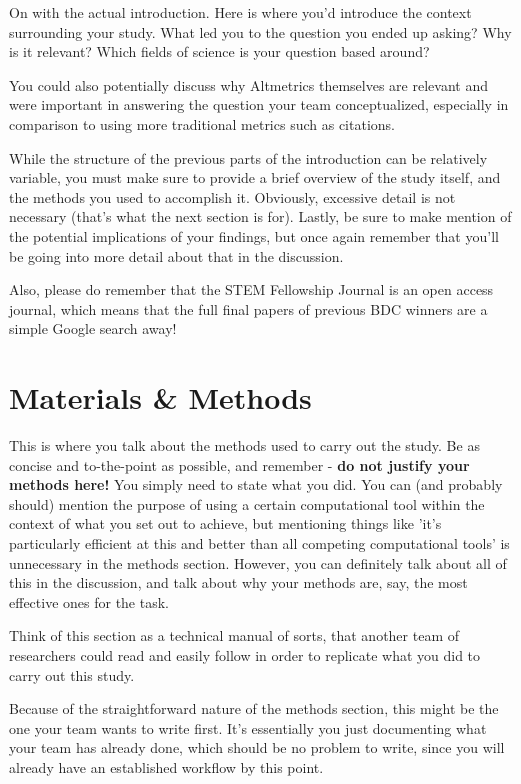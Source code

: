\documentclass[10pt,twocolumn,letterpaper]{article}
\begin{document}
On with the actual introduction. Here is where you'd introduce the context surrounding your study. What led you to the question you ended up asking? Why is it relevant? Which fields of science is your question based around?

You could also potentially discuss why Altmetrics themselves are relevant and were important in answering the question your team conceptualized, especially in comparison to using more traditional metrics such as citations.

While the structure of the previous parts of the introduction can be relatively variable, you must make sure to provide a brief overview of the study itself, and the methods you used to accomplish it. Obviously, excessive detail is not necessary (that's what the next section is for). Lastly, be sure to make mention of the potential implications of your findings, but once again remember that you'll be going into more detail about that in the discussion.

Also, please do remember that the STEM Fellowship Journal is an open access journal, which means that the full final papers of previous BDC winners are a simple Google search away!

\section{Materials \& Methods}

This is where you talk about the methods used to carry out the study. Be as concise and to-the-point as possible, and remember - \textbf{do not justify your methods here!} You simply need to state what you did. You can (and probably should) mention the purpose of using a certain computational tool within the context of what you set out to achieve, but mentioning things like 'it's particularly efficient at this and better than all competing computational tools' is unnecessary in the methods section. However, you can definitely talk about all of this in the discussion, and talk about why your methods are, say, the most effective ones for the task.

Think of this section as a technical manual of sorts, that another team of researchers could read and easily follow in order to replicate what you did to carry out this study.

Because of the straightforward nature of the methods section, this might be the one your team wants to write first. It's essentially you just documenting what your team has already done, which should be no problem to write, since you will already have an established workflow by this point.
\end{document}
